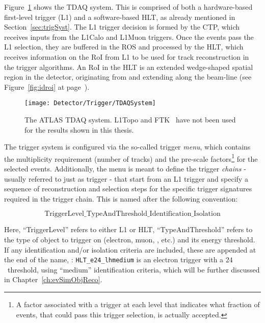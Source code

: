 		Figure~\ref{fig:TDAQSyst} shows the \ac{TDAQ} system. This is comprised of both a hardware-based first-level trigger (\ac{L1}) and a software-based \ac{HLT}, as already mentioned in Section~\ref{sec:trigSyst}. The \ac{L1} trigger decision is formed by the \ac{CTP}, which receives inputs from the \ac{L1Calo} and \ac{L1Muon} triggers. Once the events pass the \ac{L1} selection, they are buffered in the \ac{ROS} and processed by the \ac{HLT}, which receives information on the \ac{RoI} from \ac{L1} to be used for track reconstruction in the trigger algorithms. An \ac{RoI} in the \ac{HLT} is an extended wedge-shaped spatial region in the detector, originating from and extending along the beam-line (see Figure~\ref{fig:idroi} at page~\pageref{par:bjets_perf}). %

		\begin{figure}[!htb]
			\centering
			\texttt{[image: Detector/Trigger/TDAQSystem]}
			\caption{The \ac{ATLAS} \ac{TDAQ} system. \acs{L1Topo} and \ac{FTK}~\cite{ATLASTrigger2015} have not been used for the results shown in this thesis.}
			\label{fig:TDAQSyst}
		\end{figure}

		The trigger system is configured via the so-called trigger \textit{menu}, which contains the multiplicity requirement (number of tracks) and the pre-scale factors\footnote{A factor associated with a trigger at each level that indicates what fraction of events, that could pass this trigger selection, is actually accepted.} for the selected events. Additionally, the menu is meant to define the trigger \textit{chains} - usually referred to just as trigger - that start from an \ac{L1} trigger and specify a sequence of reconstruction and selection steps for the specific trigger signatures required in the trigger chain. This is named after the following convention: 

		$$\mathrm{TriggerLevel\_TypeAndThreshold\_Identification\_Isolation}$$

		\noindent Here, ``TriggerLevel'' refers to either \ac{L1} or \ac{HLT}, ``TypeAndThreshold'' refers to the type of object to trigger on (electron, muon, \met, etc.) and its energy threshold. If any identification and/or isolation criteria are included, these are appended at the end of the name, \eg: \texttt{HLT\_e24\_lhmedium} is an electron trigger with a $24$ \GeV\ threshold, using ``medium'' identification criteria, which will be further discussed in Chapter~\ref{ch:evSimObjReco}. 

